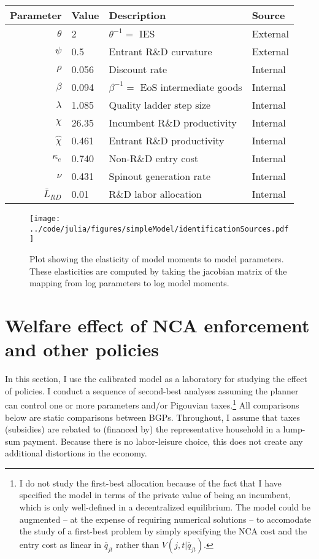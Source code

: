 \documentclass[ecta,nameyear,final]{econsocart}
\theoremstyle{plain}
\theoremstyle{remark}
\begin{document}
\begin{table}[]
	\centering
	\label{calibration_parameters}
	\begin{tabular}{rlll}
		\toprule \toprule
		Parameter & Value & Description & Source \tabularnewline
		\midrule
		$\theta$ & 2 & $\theta^{-1} = $ IES & External \tabularnewline
		$\psi$ & 0.5 & Entrant R\&D curvature & External \tabularnewline
		$\rho$ & 0.056 & Discount rate  & Internal \tabularnewline
		$\beta$ & 0.094 & $\beta^{-1} = $ EoS intermediate goods & Internal \tabularnewline 
		$\lambda$ & 1.085 & Quality ladder step size & Internal \tabularnewline
		$\chi$ & 26.35 & Incumbent R\&D productivity & Internal \tabularnewline
		$\hat{\chi}$ & 0.461 & Entrant R\&D productivity & Internal \tabularnewline 
		$\kappa_e$ & 0.740 & Non-R\&D entry cost & Internal \tabularnewline
		$\nu$ & 0.431 & Spinout generation rate  & Internal\tabularnewline
		$\bar{L}_{RD}$ & 0.01 & R\&D labor allocation  & Internal \tabularnewline
		\bottomrule
	\end{tabular}
\end{table}

\begin{figure}[]
	\centering
	\texttt{[image: ../code/julia/figures/simpleModel/identificationSources.pdf]}
	\caption{Plot showing the elasticity of model moments to model parameters. These elasticities are computed by taking the jacobian matrix of the mapping from log parameters to log model moments.}
	\label{calibration_identificationSources}
\end{figure}

\section{Welfare effect of NCA enforcement and other policies}\label{sec:policy_analysis}

In this section, I use the calibrated model as a laboratory for studying the effect of policies. I conduct a sequence of second-best analyses assuming the planner can control one or more parameters and/or Pigouvian taxes.\footnote{I do not study the first-best allocation because of the fact that I have specified the model in terms of the private value of being an incumbent, which is only well-defined in a decentralized equilibrium. The model could be augmented -- at the expense of requiring numerical solutions -- to accomodate the study of a first-best problem by simply specifying the NCA cost and the entry cost as linear in $\bar{q}_{jt}$ rather than $V(j,t|\bar{q}_{jt})$.}  All comparisons below are static comparisons between BGPs. Throughout, I assume that taxes (subsidies) are rebated to (financed by) the representative household in a lump-sum payment.  Because there is no labor-leisure choice, this does not create any additional distortions in the economy. 
\end{document}
